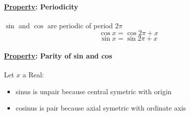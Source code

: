\documentclass{article}
\begin{document}
\paragraph*{\underline{Property}: Periodicity}
$\sin$ and $\cos$ are periodic of period $2\pi$
$$\cos{x} = \cos{2\pi+x}$$
$$\sin{x} = \sin{2\pi+x}$$

\paragraph*{\underline{Property}: Parity of sin and cos}
Let $x$ a Real:
\begin{itemize}
    \item sinus is unpair because central symetric with origin
    \item cosinus is pair because axial symetric with ordinate axis
\end{itemize}
\end{document}
